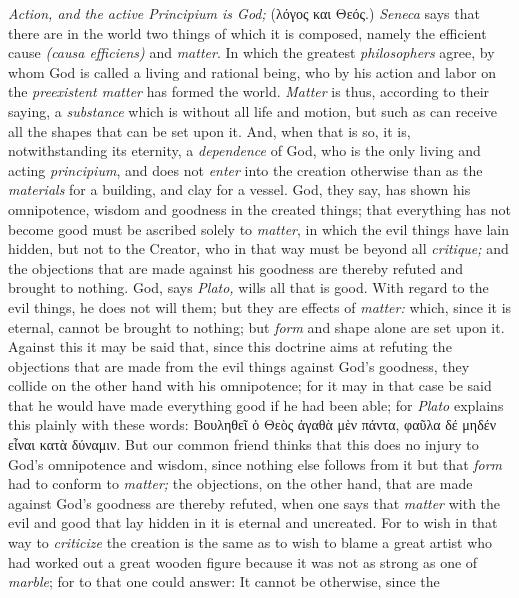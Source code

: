 \documentclass[12pt,a4paper,openany]{book}
\newcommand{\opage}[1]{\marginnote{\footnotesize\textit{[#1]}}}
\begin{document}
\setcounter{footnote}{0}%
\opage{14}\emph{Action, and the \textit{active Principium} is God;} (λόγος και Θεός.)
\textit{Seneca} says that there are in the world two things of which it is
composed, namely the efficient cause \textit{(causa efficiens)} and
\textit{matter}. In which the greatest \textit{philosophers} agree, by whom God is
called a living and rational being, who by his action and labor on the
\textit{preexistent matter} has formed the world. \textit{Matter} is thus,
according to their saying, a \textit{substance} which is without all life and
motion, but such as can receive all the shapes that can be set upon it. And, when
that is so, it is, notwithstanding its eternity, a \textit{dependence} of God,
who is the only living and acting \textit{principium}, and does not
\textit{enter} into the creation otherwise than as the \textit{materials} for a
building, and clay for a vessel. God, they say, has shown his omnipotence, wisdom
and goodness in the created things; that everything has not become good must be
ascribed solely to \textit{matter}, in which the evil things have lain hidden,
but not to the Creator, who in that way must be beyond all \textit{critique;} and
the objections that are made against his goodness are thereby refuted and brought
to nothing. God, says \textit{Plato,} wills all that is good. With regard to the
evil things, he does not will them; but they are effects of \textit{matter:}
which, since it is eternal, cannot be brought to nothing; but \textit{form} and
shape alone are set upon it. Against this it may be said that, since this
doctrine aims at refuting the objections that are made from the evil things
against God's goodness, they collide on the other hand with his omnipotence; for
it may in that case be said that he would have made everything good if he had
been able; for \textit{Plato} explains this plainly with these words: Βουληθεῖ ὁ
Θεὸς ἀγαθὰ μὲν πάντα, φαῦλα δέ μηδέν εἶναι κατὰ δύναμιν. But our common friend
thinks that this does no injury to God's omnipotence and wisdom, since nothing
else follows from it but that \textit{form} had to conform to \textit{matter;} the
objections, on the other hand, that are made against God's goodness are thereby
refuted, when one says that \textit{matter} with the evil and good that
\setcounter{footnote}{0}%
\opage{15}lay hidden in it is eternal and uncreated. For to wish in that way to
\textit{criticize} the creation is the same as to wish to blame a great artist
who had worked out a great wooden figure because it was not as strong as one of
\textit{marble}; for to that one could answer: It cannot be otherwise, since the
\end{document}

